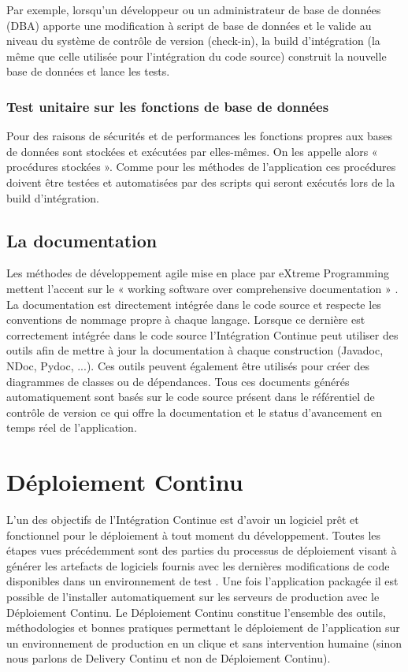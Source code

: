    Par exemple, lorsqu’un développeur ou un administrateur de base de données (DBA) apporte une modification à script de base de données et le valide au niveau du système de contrôle de version (check-in), la build d’intégration (la même que celle utilisée pour l’intégration du code source) construit la nouvelle base de données et lance les tests.

      \subsubsection{Test unitaire sur les fonctions de base de données}
      Pour des raisons de sécurités et de performances les fonctions propres aux bases de données sont stockées et exécutées par elles-mêmes. On les appelle alors « procédures stockées ». Comme pour les méthodes de l’application ces procédures doivent être testées et automatisées par des scripts qui seront exécutés lors de la build d’intégration.

    \subsection{La documentation}
    Les méthodes de développement agile mise en place par eXtreme Programming mettent l'accent sur le « working software over comprehensive documentation » \cite{HF01}. La documentation est directement intégrée dans le code source et respecte les conventions de nommage propre à chaque langage. Lorsque ce dernière est correctement intégrée dans le code source l'Intégration Continue peut utiliser des outils afin de mettre à jour la documentation à chaque construction (Javadoc, NDoc, Pydoc, ...). Ces outils peuvent également être utilisés pour créer des diagrammes de classes ou de dépendances. Tous ces documents générés automatiquement sont basés sur le code source présent dans le référentiel de contrôle de version ce qui offre la documentation et le status d'avancement en temps réel de l'application.

  \section{Déploiement Continu}
  L'un des objectifs de l’Intégration Continue est d'avoir un logiciel prêt et fonctionnel pour le déploiement à tout moment du développement. Toutes les étapes vues précédemment sont des parties du processus de déploiement visant à générer les artefacts de logiciels fournis avec les dernières modifications de code disponibles dans un environnement de test \cite{Duv07}. Une fois l’application packagée il est possible de l'installer automatiquement sur les serveurs de production avec le Déploiement Continu. Le Déploiement Continu constitue l'ensemble des outils, méthodologies et bonnes pratiques permettant le déploiement de l'application sur un environnement de production en un clique et sans intervention humaine (sinon nous parlons de Delivery Continu et non de Déploiement Continu).

